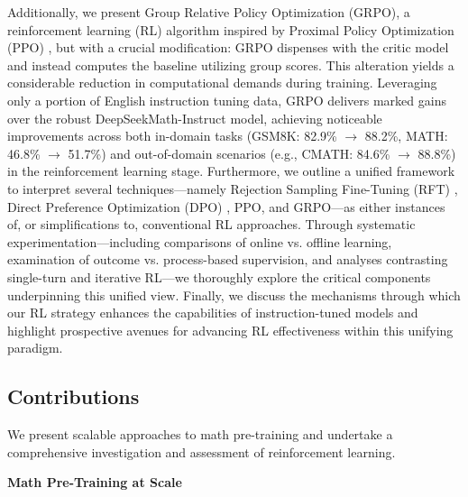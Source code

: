 Additionally, we present Group Relative Policy Optimization (GRPO), a reinforcement learning (RL) algorithm inspired by Proximal Policy Optimization (PPO) \citep{schulman2017proximal}, but with a crucial modification: GRPO dispenses with the critic model and instead computes the baseline utilizing group scores. This alteration yields a considerable reduction in computational demands during training. Leveraging only a portion of English instruction tuning data, GRPO delivers marked gains over the robust DeepSeekMath-Instruct model, achieving noticeable improvements across both in-domain tasks (GSM8K: 82.9\% $\rightarrow$ 88.2\%, MATH: 46.8\% $\rightarrow$ 51.7\%) and out-of-domain scenarios (e.g., CMATH: 84.6\% $\rightarrow$ 88.8\%) in the reinforcement learning stage. Furthermore, we outline a unified framework to interpret several techniques—namely Rejection Sampling Fine-Tuning (RFT) \citep{yuan2023scaling}, Direct Preference Optimization (DPO) \citep{dpo}, PPO, and GRPO—as either instances of, or simplifications to, conventional RL approaches. Through systematic experimentation—including comparisons of online vs. offline learning, examination of outcome vs. process-based supervision, and analyses contrasting single-turn and iterative RL—we thoroughly explore the critical components underpinning this unified view. Finally, we discuss the mechanisms through which our RL strategy enhances the capabilities of instruction-tuned models and highlight prospective avenues for advancing RL effectiveness within this unifying paradigm.

\subsection{Contributions}
We present scalable approaches to math pre-training and undertake a comprehensive investigation and assessment of reinforcement learning.

\textbf{Math Pre-Training at Scale}

